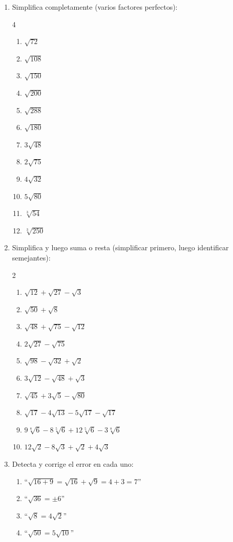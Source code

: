 \documentclass[11pt, letterpaper]{article}
\begin{document}
\begin{enumerate}[label=\textbf{\arabic*.}, leftmargin=*, resume]
  \item Simplifica completamente (varios factores perfectos):
  \begin{multicols}{4}
  \begin{enumerate}[label=\alph*)]
    \item $\sqrt{72}$
    \item $\sqrt{108}$
    \item $\sqrt{150}$
    \item $\sqrt{200}$
    \item $\sqrt{288}$
    \item $\sqrt{180}$
    \item $3\sqrt{48}$
    \item $2\sqrt{75}$
    \item $4\sqrt{32}$
    \item $5\sqrt{80}$
    \item $\sqrt[3]{54}$
    \item $\sqrt[3]{250}$
  \end{enumerate}
  \end{multicols}

  \item Simplifica y luego suma o resta (simplificar primero, luego identificar semejantes):
  \begin{multicols}{2}
  \begin{enumerate}[label=\alph*)]
    \item $\sqrt{12}+\sqrt{27}-\sqrt{3}$
    \item $\sqrt{50}+\sqrt{8}$
    \item $\sqrt{48}+\sqrt{75}-\sqrt{12}$
    \item $2\sqrt{27}-\sqrt{75}$
    \item $\sqrt{98}-\sqrt{32}+\sqrt{2}$
    \item $3\sqrt{12}-\sqrt{48}+\sqrt{3}$
    \item $\sqrt{45}+3\sqrt{5}-\sqrt{80}$
    \item $\sqrt{17}-4\sqrt{13}-5\sqrt{17}-\sqrt{17}$
    \item $9\sqrt[8]{6}-8\sqrt[5]{6}+12\sqrt[5]{6}-3\sqrt[8]{6}$
    \item $12\sqrt{2}-8\sqrt{3}+\sqrt{2}+4\sqrt{3}$
  \end{enumerate}
  \end{multicols}

  \item Detecta y corrige el error en cada uno:
  \begin{enumerate}[label=\alph*)]
    \item ``$\sqrt{16+9}=\sqrt{16}+\sqrt{9}=4+3=7$''
    \item ``$\sqrt{36}=\pm 6$''
    \item ``$\sqrt{8}=4\sqrt{2}$''
    \item ``$\sqrt{50}=5\sqrt{10}$''
  \end{enumerate}
\end{enumerate}
\end{document}
